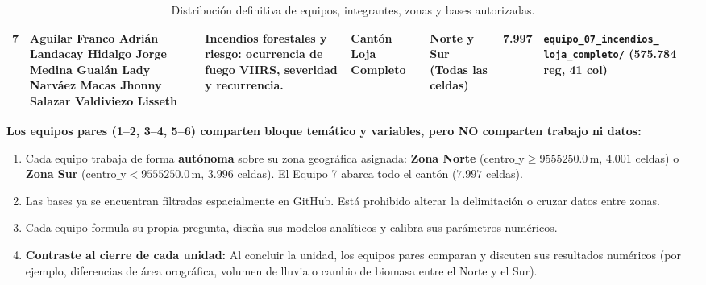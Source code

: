 \documentclass[11pt,a4paper]{article}
\begin{document}
\begin{table}[h!]
\begin{tabularx}{\textwidth}{C{0.8cm} L{3.5cm} L{3.3cm} C{1.1cm} C{1.8cm} C{1.1cm} Y}
\midrule
\textbf{7} & 
\textbullet{} Aguilar Franco Adrián\newline
\textbullet{} Landacay Hidalgo Jorge\newline
\textbullet{} Medina Gualán Lady\newline
\textbullet{} Narváez Macas Jhonny\newline
\textbullet{} Salazar Valdiviezo Lisseth & 
Incendios forestales y riesgo: ocurrencia de fuego VIIRS, severidad y recurrencia. & 
Cantón Loja Completo & 
Norte y Sur (Todas las celdas) & 
7.997 & 
\texttt{equipo\_07\_incendios\_} \newline \texttt{loja\_completo/} \newline (575.784 reg, 41 col) \\
\bottomrule
\end{tabularx}
\caption{Distribución definitiva de equipos, integrantes, zonas y bases autorizadas.}
\label{tab:distribucion_equipos}
\end{table}

\begin{alertbox}[title=Regla Territorial Fundamental para Temas Compartidos]
\textbf{Los equipos pares (1--2, 3--4, 5--6) comparten bloque temático y variables, pero NO comparten trabajo ni datos:}
\begin{enumerate}[leftmargin=*,itemsep=1pt]
  \item Cada equipo trabaja de forma \textbf{autónoma} sobre su zona geográfica asignada:
  \textbf{Zona Norte} ($\text{centro\_y} \ge 9555250.0\,\text{m}$, $4.001$ celdas) o \textbf{Zona Sur} ($\text{centro\_y} < 9555250.0\,\text{m}$, $3.996$ celdas). El Equipo 7 abarca todo el cantón ($7.997$ celdas).
  \item Las bases ya se encuentran filtradas espacialmente en GitHub. Está prohibido alterar la delimitación o cruzar datos entre zonas.
  \item Cada equipo formula su propia pregunta, diseña sus modelos analíticos y calibra sus parámetros numéricos.
  \item \textbf{Contraste al cierre de cada unidad:} Al concluir la unidad, los equipos pares comparan y discuten sus resultados numéricos (por ejemplo, diferencias de área orográfica, volumen de lluvia o cambio de biomasa entre el Norte y el Sur).
\end{enumerate}
\end{alertbox}

\end{document}
